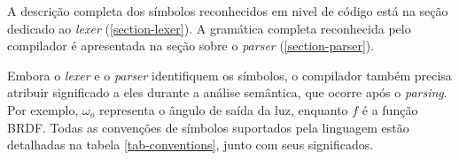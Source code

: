 %
%

A descrição completa dos símbolos reconhecidos em nivel de código está na seção dedicado ao \textit{lexer} (\autoref{section-lexer}). A gramática completa reconhecida pelo compilador é apresentada na seção sobre o \textit{parser} (\autoref{section-parser}).

Embora o \textit{lexer} e o \textit{parser} identifiquem os símbolos, o compilador também precisa atribuir significado a eles durante a análise semântica, que ocorre após o \textit{parsing}. Por exemplo, $\omega_o$ representa o ângulo de saída da luz, enquanto $f$ é a função BRDF. Todas as convenções de símbolos suportados pela linguagem estão detalhadas na tabela \autoref{tab-conventions}, junto com seus significados.


